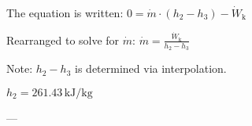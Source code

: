The equation is written:  
\( 0 = \dot{m} \cdot (h_2 - h_3) - \dot{W}_\text{k} \)  

Rearranged to solve for \( \dot{m} \):  
\( \dot{m} = \frac{\dot{W}_\text{k}}{h_2 - h_3} \)  

Note: \( h_2 - h_3 \) is determined via interpolation.  

\( h_2 = 261.43 \, \text{kJ/kg} \)  

---